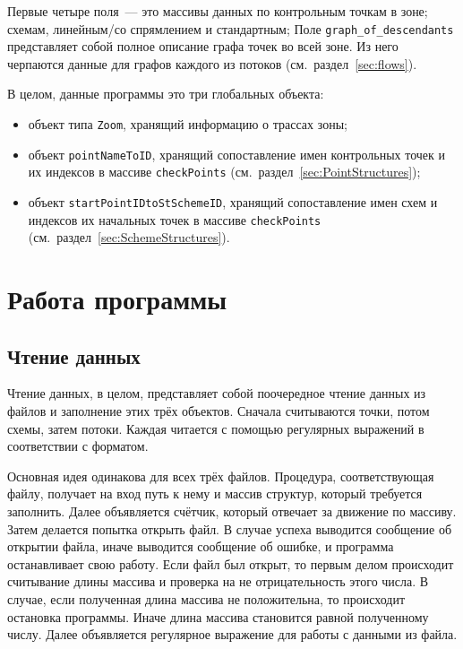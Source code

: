 \documentclass[12pt]{article}
\theoremstyle{plain}
\begin{document}
Первые четыре поля~--- это массивы данных по контрольным точкам в зоне; схемам, линейным/со спрямлением и стандартным; Поле \texttt{graph\_of\_descendants} представляет собой полное описание графа точек во всей зоне. Из него черпаются данные для графов каждого из потоков (см.~раздел~\ref{sec:flows}).

В целом, данные программы это три глобальных объекта:
\begin{itemize}[topsep=-0.5\parsep,itemsep=-0.5\parsep]
  \item объект типа \texttt{Zoom}, хранящий информацию о трассах зоны;
  \item объект \texttt{pointNameToID}, хранящий сопоставление имен контрольных точек и их индексов в массиве \texttt{checkPoints} (см.~раздел~\ref{sec:PointStructures});
  \item объект \texttt{startPointIDtoStSchemeID}, хранящий сопоставление имен схем и индексов их начальных точек в массиве \texttt{checkPoints} (см.~раздел~\ref{sec:SchemeStructures}).
\end{itemize}

\section{Работа программы}

\subsection{Чтение данных}

Чтение данных, в целом, представляет собой поочередное чтение данных из файлов и заполнение этих трёх объектов. Сначала считываются точки, потом схемы, затем потоки. Каждая читается с помощью регулярных выражений в соответствии с форматом.

Основная идея одинакова для всех трёх файлов. Процедура, соответствующая файлу, получает на вход путь к нему и массив структур, который требуется заполнить. Далее объявляется счётчик, который отвечает за движение по массиву. Затем делается попытка открыть файл. В случае успеха выводится сообщение об открытии файла, иначе выводится сообщение об ошибке, и программа останавливает свою работу. Если файл был открыт, то первым делом происходит считывание длины массива и проверка на не отрицательность этого числа. В случае, если полученная длина массива не положительна, то происходит остановка программы. Иначе длина массива становится равной полученному числу. Далее объявляется регулярное выражение для работы с данными из файла. 
\end{document}
